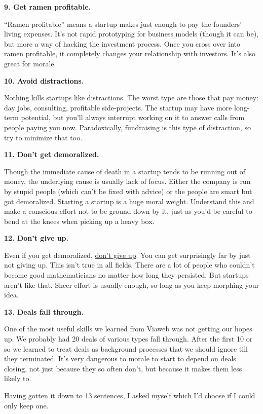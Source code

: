 \textbf{9. Get ramen profitable.}

``Ramen profitable'' means a startup makes just enough to pay the
founders' living expenses. It's not rapid prototyping for business
models (though it can be), but more a way of hacking the investment
process. Once you cross over into ramen profitable, it completely
changes your relationship with investors. It's also great for morale.

\textbf{10. Avoid distractions.}

Nothing kills startups like distractions. The worst type are those that
pay money: day jobs, consulting, profitable side-projects. The startup
may have more long-term potential, but you'll always interrupt working
on it to answer calls from people paying you now. Paradoxically,
\href{fundraising.html}{fundraising} is this type of distraction, so try
to minimize that too.

\textbf{11. Don't get demoralized.}

Though the immediate cause of death in a startup tends to be running out
of money, the underlying cause is usually lack of focus. Either the
company is run by stupid people (which can't be fixed with advice) or
the people are smart but got demoralized. Starting a startup is a huge
moral weight. Understand this and make a conscious effort not to be
ground down by it, just as you'd be careful to bend at the knees when
picking up a heavy box.

\textbf{12. Don't give up.}

Even if you get demoralized, \href{die.html}{don't give up}. You can get
surprisingly far by just not giving up. This isn't true in all fields.
There are a lot of people who couldn't become good mathematicians no
matter how long they persisted. But startups aren't like that. Sheer
effort is usually enough, so long as you keep morphing your idea.

\textbf{13. Deals fall through.}

One of the most useful skills we learned from Viaweb was not getting our
hopes up. We probably had 20 deals of various types fall through. After
the first 10 or so we learned to treat deals as background processes
that we should ignore till they terminated. It's very dangerous to
morale to start to depend on deals closing, not just because they so
often don't, but because it makes them less likely to.

Having gotten it down to 13 sentences, I asked myself which I'd choose
if I could only keep one.

